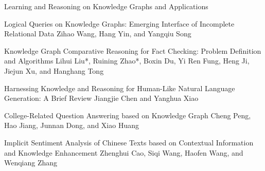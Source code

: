 \documentclass[11pt]{article}
\begin{document}
\begin{bulletin}
\begin{articlesection}{Learning and Reasoning on Knowledge Graphs and Applications}

% 


\begin{article}
{Logical Queries on Knowledge Graphs: Emerging Interface of Incomplete Relational Data}
{Zihao Wang, Hang Yin, and Yangqiu Song}

\end{article}

\begin{article}
{Knowledge Graph Comparative Reasoning for Fact Checking: Problem Definition and Algorithms}
{Lihui Liu*, Ruining Zhao*,  Boxin Du, Yi Ren Fung, Heng Ji, Jiejun Xu, and Hanghang Tong}

\end{article}


%


\begin{article}
{Harnessing Knowledge and Reasoning for Human-Like Natural Language Generation: A Brief Review}
{Jiangjie Chen and Yanghua Xiao}

\end{article}

\begin{article}
{College-Related Question Answering based on Knowledge Graph}
{Cheng Peng,  Hao Jiang, Junnan Dong, and Xiao Huang}

\end{article}

\begin{article}
{Implicit Sentiment Analysis of Chinese Texts based on Contextual Information and Knowledge Enhancement}
{Zhenghui Cao, Siqi Wang,  Haofen Wang, and Wenqiang Zhang }

\end{article}



\end{articlesection}
\end{bulletin}
\end{document}
